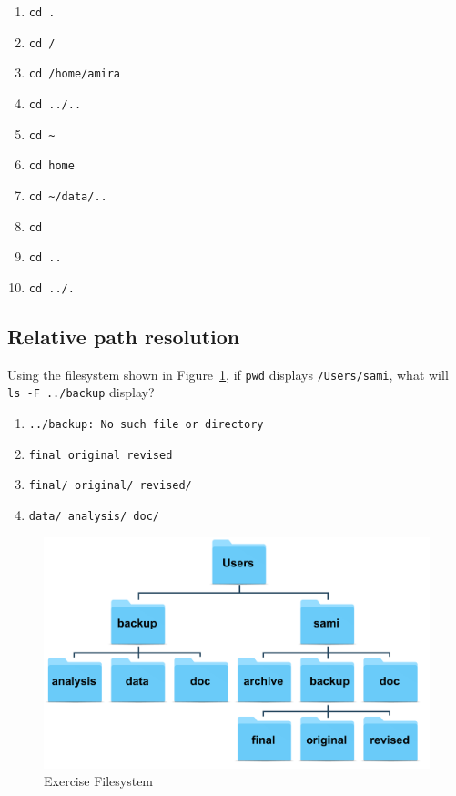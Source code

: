 \documentclass[
]{krantz}
\providecommand{\tightlist}{%
  \setlength{\itemsep}{0pt}\setlength{\parskip}{0pt}}
\begin{document}
\begin{enumerate}
\def\labelenumi{\arabic{enumi}.}
\tightlist
\item
  \texttt{cd\ .}
\item
  \texttt{cd\ /}
\item
  \texttt{cd\ /home/amira}
\item
  \texttt{cd\ ../..}
\item
  \texttt{cd\ \textasciitilde{}}
\item
  \texttt{cd\ home}
\item
  \texttt{cd\ \textasciitilde{}/data/..}
\item
  \texttt{cd}
\item
  \texttt{cd\ ..}
\item
  \texttt{cd\ ../.}
\end{enumerate}

\hypertarget{bash-basics-ex-resolve-rel-path}{%
\subsection{Relative path resolution}\label{bash-basics-ex-resolve-rel-path}}

Using the filesystem shown in Figure~\ref{fig:bash-basics-ex-rel-path},
if \texttt{pwd} displays \texttt{/Users/sami},
what will \texttt{ls\ -F\ ../backup} display?

\begin{enumerate}
\def\labelenumi{\arabic{enumi}.}
\tightlist
\item
  \texttt{../backup:\ No\ such\ file\ or\ directory}
\item
  \texttt{final\ original\ revised}
\item
  \texttt{final/\ original/\ revised/}
\item
  \texttt{data/\ analysis/\ doc/}
\end{enumerate}

\begin{figure}

{\centering \includegraphics[width=1\linewidth]{figures/bash-basics/exercise-filesystem} 

}

\caption{Exercise Filesystem}\label{fig:bash-basics-ex-rel-path}
\end{figure}
\end{document}
